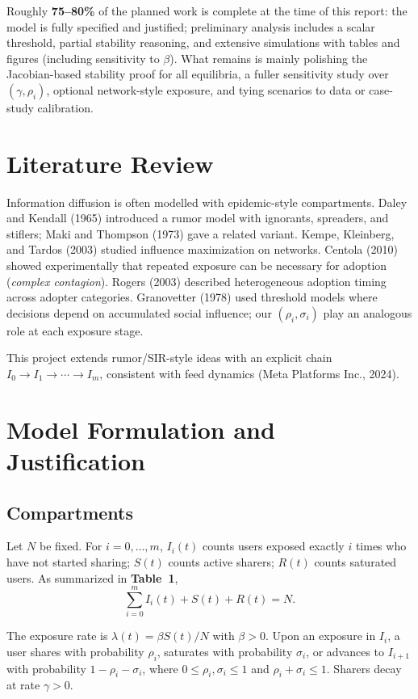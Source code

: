 \documentclass[11pt]{article}
\begin{document}
Roughly \textbf{75--80\%} of the planned work is complete at the time of this report: the model is fully specified and justified; preliminary analysis includes a scalar threshold, partial stability reasoning, and extensive simulations with tables and figures (including sensitivity to $\beta$). What remains is mainly polishing the Jacobian-based stability proof for all equilibria, a fuller sensitivity study over $(\gamma,\rho_i)$, optional network-style exposure, and tying scenarios to data or case-study calibration.

\section{Literature Review}

Information diffusion is often modelled with epidemic-style compartments. Daley and Kendall (1965) introduced a rumor model with ignorants, spreaders, and stiflers; Maki and Thompson (1973) gave a related variant. Kempe, Kleinberg, and Tardos (2003) studied influence maximization on networks. Centola (2010) showed experimentally that repeated exposure can be necessary for adoption (\emph{complex contagion}). Rogers (2003) described heterogeneous adoption timing across adopter categories. Granovetter (1978) used threshold models where decisions depend on accumulated social influence; our $(\rho_i,\sigma_i)$ play an analogous role at each exposure stage.

This project extends rumor/SIR-style ideas with an explicit chain $I_0\to I_1\to\cdots\to I_m$, consistent with feed dynamics (Meta Platforms Inc., 2024).

\section{Model Formulation and Justification}

\subsection{Compartments}

Let $N$ be fixed. For $i=0,\ldots,m$, $I_i(t)$ counts users exposed exactly $i$ times who have not started sharing; $S(t)$ counts active sharers; $R(t)$ counts saturated users. As summarized in \textbf{Table~1},
\[
\sum_{i=0}^{m} I_i(t) + S(t) + R(t) = N.
\]

The exposure rate is $\lambda(t)=\beta S(t)/N$ with $\beta>0$. Upon an exposure in $I_i$, a user shares with probability $\rho_i$, saturates with probability $\sigma_i$, or advances to $I_{i+1}$ with probability $1-\rho_i-\sigma_i$, where $0\le\rho_i,\sigma_i\le 1$ and $\rho_i+\sigma_i\le 1$. Sharers decay at rate $\gamma>0$.
\end{document}
